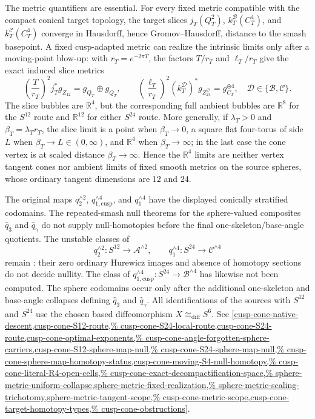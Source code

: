\begin{enumerate}[leftmargin=1.8em]
The metric quantifiers are essential.  For every fixed metric compatible
with the compact conical target topology, the target slices
\(j_T(Q_T^2)\), \(k_T^{\mathcal B}(C_T^4)\), and
\(k_T^{\mathcal C}(C_T^4)\) converge in Hausdorff, hence
Gromov--Hausdorff, distance to the smash basepoint.  A fixed cusp-adapted
metric can realize the intrinsic limits only after a moving-point blow-up:
with \(r_T=e^{-2\pi T}\), the factors \(T/r_T\) and
\(\ell_T/r_T\) give the exact induced slice metrics
\[
 \left(\frac{T}{r_T}\right)^2j_T^*g_{Z_{12}}
   =g_{Q_T}\oplus g_{Q_T},\qquad
 \left(\frac{\ell_T}{r_T}\right)^2
   (k_T^{\mathcal D})^*g_{Z_{24}^{\mathcal D}}
   =g_{C_T}^{\oplus4},\quad
 \mathcal D\in\{\mathcal B,\mathcal C\}.
\]
The slice bubbles are \(\mathbb R^4\), but the corresponding full ambient
bubbles are \(\mathbb R^8\) for the \(S^{12}\) route and
\(\mathbb R^{12}\) for either \(S^{24}\) route.  More generally, if
\(\lambda_T>0\) and \(\beta_T=\lambda_Tr_T\), the slice limit is a point
when \(\beta_T\to0\), a square flat four-torus of side \(L\) when
\(\beta_T\to L\in(0,\infty)\), and \(\mathbb R^4\) when
\(\beta_T\to\infty\); in the last case the cone vertex is at scaled
distance \(\beta_T\to\infty\).  Hence the \(\mathbb R^4\) limits are
neither vertex tangent cones nor ambient limits of fixed smooth metrics on
the source spheres, whose ordinary tangent dimensions are \(12\) and \(24\).

The original maps \(q_2^{\wedge2}\), \(q_{1,\mathrm{cusp}}^{\wedge4}\),
and \(q_1^{\wedge4}\) have the displayed conically stratified codomains.
The repeated-smash null theorems for the sphere-valued composites
\(\widehat q_3\) and \(\widehat q_\gamma\) do not supply null-homotopies
before the final one-skeleton/base-angle quotients.  The unstable classes of
\[
 q_2^{\wedge2}:S^{12}\to\mathcal A^{\wedge2},
 \qquad
 q_1^{\wedge4}:S^{24}\to\mathcal C^{\wedge4}
\]
remain \Open: their zero ordinary Hurewicz images and absence of homotopy
sections do not decide nullity.  The class of
\(q_{1,\mathrm{cusp}}^{\wedge4}:S^{24}\to\mathcal B^{\wedge4}\) has
likewise not been computed.
The sphere codomains occur only after the additional one-skeleton and
base-angle collapses defining \(\widehat q_3\) and
\(\widehat q_\gamma\).  All identifications of the sources with
\(S^{12}\) and \(S^{24}\) use the chosen based diffeomorphism
\(X\cong_{\mathrm{diff}}S^6\).  See
\cref{cusp-cone-native-descent,cusp-cone-S12-route,%
cusp-cone-S24-local-route,cusp-cone-S24-route,cusp-cone-optimal-exponents,%
cusp-cone-angle-forgotten-sphere-carriers,cusp-cone-S12-sphere-map-null,%
cusp-cone-S24-sphere-map-null,%
cusp-cone-sphere-map-homotopy-status,cusp-cone-moving-S4-null-homotopy,%
cusp-cone-literal-R4-open-cells,%
cusp-cone-exact-decompactification-space,%
sphere-metric-uniform-collapse,sphere-metric-fixed-realization,%
sphere-metric-scaling-trichotomy,sphere-metric-tangent-scope,%
cusp-cone-metric-scope,cusp-cone-target-homotopy-types,%
cusp-cone-obstructions}.


\end{enumerate}
